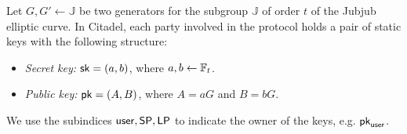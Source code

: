 
Let $G, G'\gets\mathbb{J}$ be two generators for the subgroup $\mathbb{J}$ of order $t$ of the Jubjub elliptic curve. 
In Citadel, each party involved in the protocol holds a pair of static keys with the following structure:

\begin{itemize}
	\item \textit{Secret key:} $\mathsf{sk} = (a,b)$, where $a,b\gets \mathbb{F}_t$.
	\item \textit{Public key:} $\mathsf{pk} = (A,B)$, where $A = a G$ and $B = b G$.
\end{itemize}

We use the subindices $\mathsf{user}, \mathsf{SP}, \mathsf{LP}$ to indicate the owner of the keys, e.g. $\mathsf{pk}_{\mathsf{user}}$.